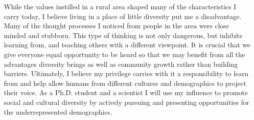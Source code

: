 \documentclass[11pt]{amsart}
\begin{document}
While the values instilled in a rural area shaped many of the characteristics I carry today, I believe living in a place of little diversity put me a disadvantage. 
Many of the thought processes I noticed from people in the area were close minded and stubborn.
This type of thinking is not only dangerous, but inhibits learning from, and teaching others with a different viewpoint. 
It is crucial that we give everyone equal opportunity to be heard so that we may benefit from all the advantages diversity brings as well as community growth rather than building barriers.
Ultimately, I believe my privilege carries with it a responsibility to learn from and help allow humans from different cultures and demographics to project their voice.
As a Ph.D. student and a scientist I will use my influence to promote social and cultural diversity by actively pursuing and presenting opportunities for the underrepresented demographics.
\end{document}
